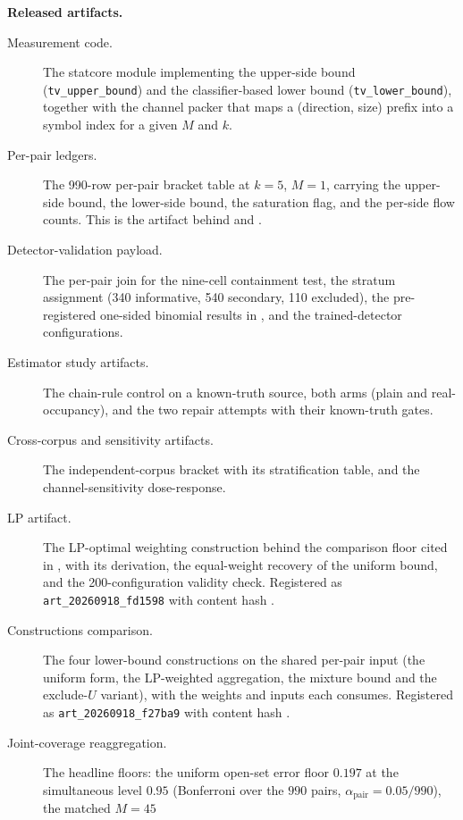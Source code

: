 \documentclass[sigconf,anonymous,review]{acmart}
\begin{document}
\textbf{Released artifacts.}
\begin{description}
  \item[Measurement code.] The statcore module implementing the upper-side
  bound (\texttt{tv\_upper\_bound}) and the classifier-based lower bound
  (\texttt{tv\_lower\_bound}), together with the channel packer that maps a
  (direction, size) prefix into a symbol index for a given $M$ and $k$.
  \item[Per-pair ledgers.] The 990-row per-pair bracket table at $k{=}5$,
  $M{=}1$, carrying the upper-side bound, the lower-side bound, the saturation
  flag, and the per-side flow counts. This is the artifact behind
   and .
  \item[Detector-validation payload.] The per-pair join for the nine-cell
  containment test, the stratum assignment (340 informative, 540 secondary,
  110 excluded), the pre-registered one-sided binomial results in
  , and the trained-detector configurations.
  \item[Estimator study artifacts.] The chain-rule control on a known-truth
  source, both arms (plain and real-occupancy), and the two repair attempts
  with their known-truth gates.
  \item[Cross-corpus and sensitivity artifacts.] The independent-corpus bracket
  with its stratification table, and the channel-sensitivity dose-response.
  \item[LP artifact.] The LP-optimal weighting construction behind the
  comparison floor cited in , with its derivation, the
  equal-weight recovery of the uniform bound, and the 200-configuration validity
  check. Registered as \texttt{art\_20260918\_fd1598} with content hash
  \texttt{}.
  \item[Constructions comparison.] The four lower-bound constructions on the
  shared per-pair input (the uniform form, the LP-weighted aggregation, the
  mixture bound and the exclude-$U$ variant), with the weights and inputs each
  consumes. Registered as \texttt{art\_20260918\_f27ba9} with content hash
  \texttt{}.
  \item[Joint-coverage reaggregation.] The headline floors: the uniform
  open-set error floor $0.197$ at the simultaneous level $0.95$ (Bonferroni over
  the $990$ pairs, $\alpha_{\mathrm{pair}} = 0.05/990$), the matched $M{=}45$

\end{description}
\end{document}
